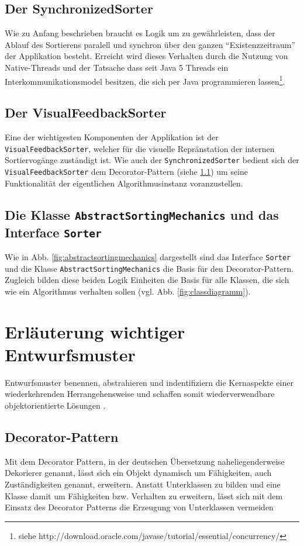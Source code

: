 \subsection{Der SynchronizedSorter}
Wie zu Anfang beschrieben braucht es Logik um zu gewährleisten, dass der Ablauf des Sortierens paralell und synchron über den ganzen
"`Existenzzeitraum"' der Applikation besteht. Erreicht wird dieses Verhalten durch die Nutzung von Native-Threads und der Tatsache 
dass seit Java 5 Threads ein Interkommunikationsmodel besitzen, die 
sich per Java programmieren lassen\footnote{siehe http://download.oracle.com/javase/tutorial/essential/concurrency/}.

\subsection{Der VisualFeedbackSorter}
Eine der wichtigesten Komponenten der Applikation ist der \texttt{VisualFeedbackSorter}, welcher für die visuelle Repränstation 
der internen Sortiervogänge zuständigt ist. Wie auch der \texttt{SynchronizedSorter} bedient sich der \texttt{VisualFeedbackSorter} dem Decorator-Pattern (siehe  
\ref{sec:decoratorpattern}) um seine Funktionalität der eigentlichen Algorithmusinstanz voranzustellen.

\subsection{Die Klasse \texttt{AbstractSortingMechanics} und das Interface \texttt{Sorter}}
Wie in Abb. \ref{fig:abstractsortingmechanics} dargestellt sind das Interface \texttt{Sorter} und die Klasse \newline \texttt{AbstractSortingMechanics} die Basis 
für den Decorator-Pattern. Zugleich bilden diese beiden Logik Einheiten die Basis für alle Klassen, 
die sich wie ein Algorithmus verhalten sollen (vgl. Abb. \ref{fig:classdiagramm}). 
\newpage

\section{Erläuterung wichtiger Entwurfsmuster}
Entwurfsmuster benennen, abstrahieren und indentifiziern die Kernaspekte einer wiederkehrenden Herrangehensweise und schaffen somit wiederverwendbare
objektorientierte Lösungen \parencite[vgl.][S.3]{designpatterns}.   

\subsection{Decorator-Pattern}
\label{sec:decoratorpattern}
\begin{munquote}
Mit dem Decorator Pattern, in der deutschen Übersetzung naheliegenderweise Dekorierer genannt, 
lässt sich ein Objekt dynamisch um Fähigkeiten, auch Zuständigkeiten genannt, erweitern. 
Anstatt Unterklassen zu bilden und eine Klasse damit um Fähigkeiten bzw. Verhalten zu erweitern, lässt sich mit dem Einsatz des Decorator Patterns 
die Erzeugung von Unterklassen vermeiden
\end{munquote}

